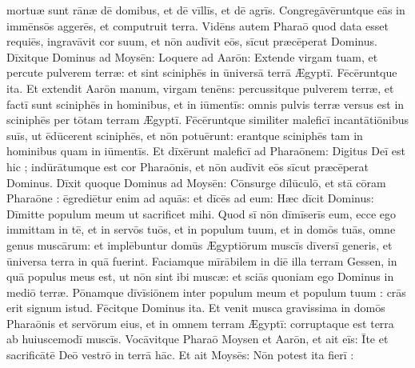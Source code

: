 mortuæ sunt rānæ dē domibus, et dē vīllīs, et dē agrīs. 
Congregāvēruntque eās in immēnsōs
aggerēs, et computruit terra.  Vidēns
autem Pharaō quod data esset requiēs, ingravāvit cor suum, et
nōn audīvit eōs, sīcut præcēperat Dominus. 
Dīxitque Dominus ad Moysēn: Loquere ad Aarōn: Extende
virgam tuam, et percute pulverem terræ: et sint
sciniphēs in ūniversā terrā Ægyptī.  Fēcēruntque ita. Et
extendit Aarōn manum, virgam tenēns: percussitque pulverem
terræ, et factī sunt sciniphēs in hominibus, et in
iūmentīs: omnis pulvis terræ versus est in
sciniphēs per tōtam terram Ægyptī.  Fēcēruntque
similiter maleficī incantātiōnibus suīs, ut
ēdūcerent sciniphēs, et nōn potuērunt: erantque
sciniphēs tam in hominibus quam in
iūmentīs.  Et dīxērunt maleficī ad
Pharaōnem: Digitus Deī est hic ; indūrātumque est cor Pharaōnis, et nōn audīvit eōs
sīcut præcēperat Dominus.  Dīxit quoque
Dominus ad Moysēn: Cōnsurge
dīlūculō, et stā cōram Pharaōne :
ēgrediētur enim ad aquās: et dīcēs ad eum: Hæc dīcit Dominus: Dīmitte
populum meum ut sacrificet mihi.  Quod sī nōn dīmīserīs
eum, ecce ego immittam in tē, et in servōs tuōs, et in
populum tuum, et in domōs tuās, omne genus muscārum: et
implēbuntur domūs Ægyptiōrum muscīs dīversī
generis, et ūniversa terra in quā fuerint.  Faciamque mīrābilem in diē
illa terram Gessen, in quā populus meus est, ut nōn sint ibi
muscæ: et sciās quoniam ego Dominus in mediō terræ. 
Pōnamque dīvīsiōnem inter populum meum et populum tuum :
crās erit signum istud.  Fēcitque Dominus ita. Et venit
musca gravissima in domōs Pharaōnis et
servōrum eius, et in omnem terram Ægyptī: corruptaque est
terra ab huiuscemodī muscīs.  Vocāvitque
Pharaō Moysen et Aarōn, et ait eīs: Īte et
sacrificātē Deō vestrō in terrā hāc.  Et ait
Moysēs: Nōn potest ita fierī :
